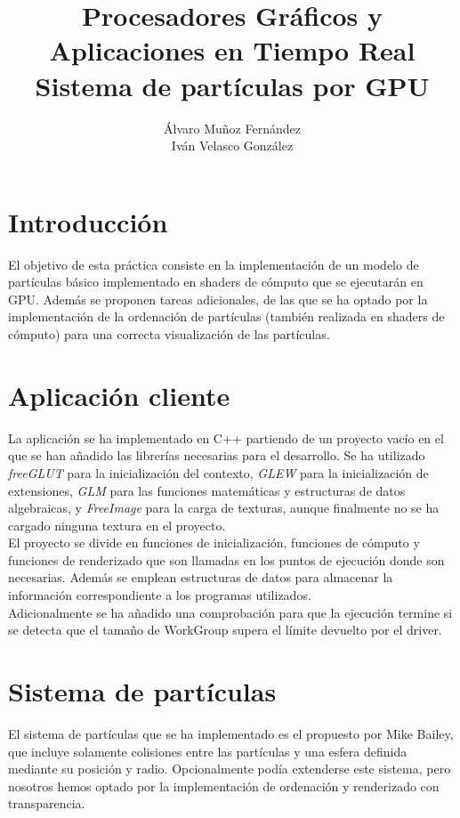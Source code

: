\documentclass[10pt,oneside,a4paper]{article}
\begin{document}
\begin{titlepage}

\title{\Huge Procesadores Gráficos y Aplicaciones en Tiempo Real  \\[0.7in] \LARGE Sistema de partículas por GPU\\[3.6in]}
\date{}
\author{Álvaro Muñoz Fernández\\
Iván Velasco González}
\maketitle
\thispagestyle{empty}
\end{titlepage}

\section{Introducción}
El objetivo de esta práctica consiste en la implementación de un modelo de partículas básico implementado en shaders de cómputo que se ejecutarán en GPU. Además se proponen tareas adicionales, de las que se ha optado por la implementación de la ordenación de partículas (también realizada en shaders de cómputo) para una correcta visualización de las partículas.

\section{Aplicación cliente}
La aplicación se ha implementado en C++ partiendo de un proyecto vacío en el que se han añadido las librerías necesarias para el desarrollo. Se ha utilizado \textit{freeGLUT} para la inicialización del contexto, \textit{GLEW} para la inicialización de extensiones, \textit{GLM} para las funciones matemáticas y estructuras de datos algebraicas, y \textit{FreeImage} para la carga de texturas, aunque finalmente no se ha cargado ninguna textura en el proyecto.\\

El proyecto se divide en funciones de inicialización, funciones de cómputo y funciones de renderizado que son llamadas en los puntos de ejecución donde son necesarias. Además se emplean estructuras de datos para almacenar la información correspondiente a los programas utilizados.\\

Adicionalmente se ha añadido una comprobación para que la ejecución termine si se detecta que el tamaño de WorkGroup supera el límite devuelto por el driver.

\section{Sistema de partículas}
El sistema de partículas que se ha implementado es el propuesto por Mike Bailey, que incluye solamente colisiones entre las partículas y una esfera definida mediante su posición y radio. Opcionalmente podía extenderse este sistema, pero nosotros hemos optado por la implementación de ordenación y renderizado con transparencia.\\
\end{document}
